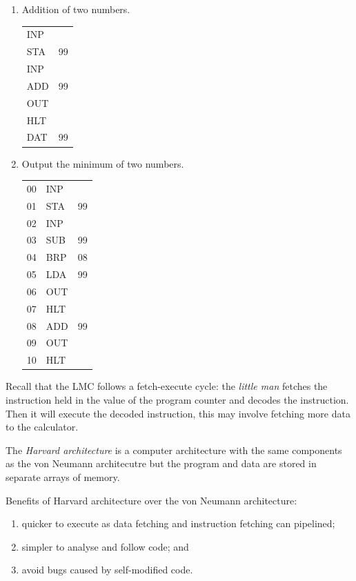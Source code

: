 \begin{examples}
	\begin{enumerate}
		\item Addition of two numbers.

		{
			\ttfamily
			\begin{tabular}{ll}
				INP \\
				STA & 99 \\
				INP \\
				ADD & 99 \\
				OUT \\
				HLT \\
				DAT & 99 \\
			\end{tabular}
		}\pagebreak

		\item Output the minimum of two numbers.

		{
			\ttfamily
			\begin{tabular}{lll}
				00 & INP \\
				01 & STA & 99 \\
				02 & INP & \\
				03 & SUB & 99 \\
				04 & BRP & 08 \\
				05 & LDA & 99 \\
				06 & OUT & \\
				07 & HLT & \\
				08 & ADD & 99 \\
				09 & OUT & \\
				10 & HLT & \\
			\end{tabular}
		}
	\end{enumerate}
\end{examples}

Recall that the LMC follows a fetch-execute cycle: the \emph{little man}
fetches the instruction held in the value of the program counter and decodes
the instruction. Then it will execute the decoded instruction,
this may involve fetching more data to the calculator.

\begin{definition}
	The \emph{Harvard architecture} is a computer architecture with the same
	components as the von Neumann architecutre but the program and data 
	are stored in separate arrays of memory.
\end{definition}

Benefits of Harvard architecture over the von Neumann architecture:
\begin{enumerate}
	\item quicker to execute as data fetching and instruction fetching can
		pipelined;
	\item simpler to analyse and follow code; and
	\item avoid bugs caused by self-modified code.
\end{enumerate}

